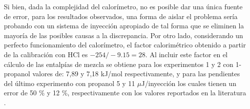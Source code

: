 	Si bien, dada la complejidad del calor\'imetro, no es posible dar una \'unica fuente de error, para los resultados observados, una forma de aislar el problema ser\'ia probando con un sistema de inyecci\'on apropiado de tal forma que se eliminen la mayor\'ia de las posibles causas a la discrepancia. Por otro lado, considerando un perfecto funcionamiento del calor\'imetro, el factor calorim\'etrico obtenido a partir de la calibraci\'on con HCl es $-254/-9.15 = 28$. Al incluir este factor en el cálculo de las entalpías de mezcla se obtiene para los experimentos 1 y 2 con 1-propanol valores de: 7,89 y 7,18 kJ/mol respectivamente, y para las pendientes del último experimento con propanol 5 y 11 $\mu$J/inyección los cuales tienen un error de 50 \% y 12 \%, respectivamente con los valores reportados en la literatura \cite{demarse2011calibration, nanoitc}.